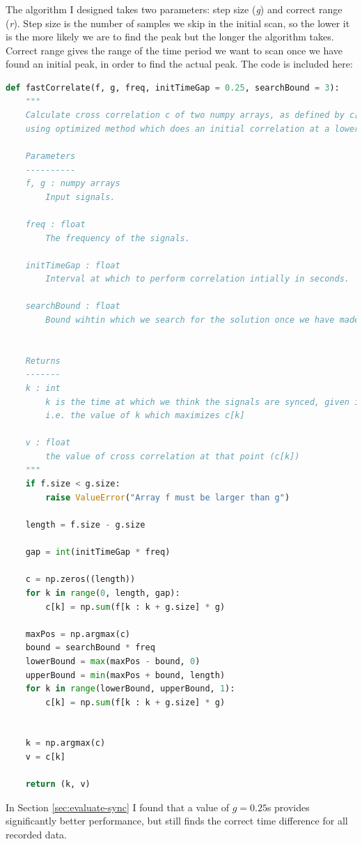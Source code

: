 \documentclass[12pt,a4paper,twoside,openright]{report}
\begin{document}
The algorithm I designed takes two parameters: step size (\emph{g}) and
correct range (\emph{r}). Step size is the number of samples we skip in the initial scan, so the
lower it is the more likely we are to find the peak but the longer the
algorithm takes. Correct range gives the range of the time period we want to
scan once we have found an initial peak, in order to find the actual peak. The
code is included here:
\begin{lstlisting}[language=Python]
def fastCorrelate(f, g, freq, initTimeGap = 0.25, searchBound = 3):
    """
    Calculate cross correlation c of two numpy arrays, as defined by c[k] = sum_n (f[n+k] * g[n])
    using optimized method which does an initial correlation at a lower resolution and then hones in on the solution.

    Parameters
    ----------
    f, g : numpy arrays
        Input signals.

    freq : float
        The frequency of the signals.

    initTimeGap : float
        Interval at which to perform correlation intially in seconds. 

    searchBound : float
        Bound wihtin which we search for the solution once we have made an initial pass.
        

    Returns
    -------
    k : int
        k is the time at which we think the signals are synced, given in terms of the number of samples through f we are.
        i.e. the value of k which maximizes c[k]

    v : float
        the value of cross correlation at that point (c[k])
    """
    if f.size < g.size:
        raise ValueError("Array f must be larger than g")

    length = f.size - g.size

    gap = int(initTimeGap * freq)

    c = np.zeros((length))
    for k in range(0, length, gap):
        c[k] = np.sum(f[k : k + g.size] * g)

    maxPos = np.argmax(c)
    bound = searchBound * freq
    lowerBound = max(maxPos - bound, 0)
    upperBound = min(maxPos + bound, length)
    for k in range(lowerBound, upperBound, 1):
        c[k] = np.sum(f[k : k + g.size] * g)


    k = np.argmax(c)
    v = c[k]

    return (k, v)
\end{lstlisting}

In Section \ref{sec:evaluate-sync} I found that a value of \(g=0.25\)s
provides significantly better performance, but still finds the correct time
difference for all recorded data.
\end{document}
